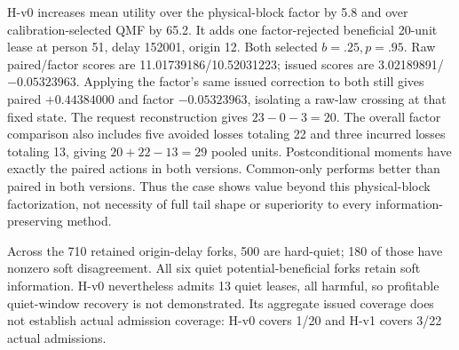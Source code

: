 \begin{table}[t]
\centering\small
\caption{Complete H-v1 minus H-v0 changes after each version independently performs the same calibration search. This includes hyperparameter reselection, not only pointwise score clipping.}
\label{tab:h-development-version-changes}
\end{table}

H-v0 increases mean utility over the physical-block factor by 5.8 and over
calibration-selected QMF by 65.2. It adds one factor-rejected beneficial
20-unit lease at person 51, delay 152001, origin 12. Both selected
$b=.25,p=.95$. Raw paired/factor scores are 11.01739186/10.52031223;
issued scores are 3.02189891/$-0.05323963$. Applying the factor's same
issued correction to both still gives paired $+0.44384000$ and factor
$-0.05323963$, isolating a raw-law crossing at that fixed state.
The request reconstruction gives $23-0-3=20$. The overall factor comparison
also includes five avoided losses totaling 22 and three incurred losses
totaling 13, giving $20+22-13=29$ pooled units.
Postconditional moments have exactly the paired actions in both versions.
Common-only performs better than paired in both versions. Thus the case
shows value beyond this physical-block factorization, not necessity of
full tail shape or superiority to every information-preserving method.

Across the 710 retained origin-delay forks, 500 are hard-quiet; 180 of those
have nonzero soft disagreement. All six quiet potential-beneficial forks
retain soft information. H-v0 nevertheless admits 13 quiet leases, all
harmful, so profitable quiet-window recovery is not demonstrated. Its
aggregate issued coverage does not establish actual admission
coverage: H-v0 covers 1/20 and H-v1 covers 3/22 actual admissions.

